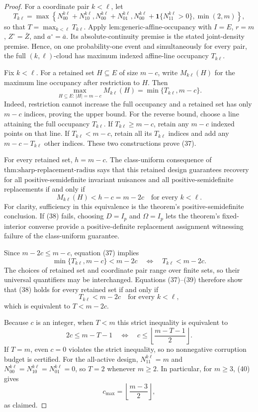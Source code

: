 \documentclass{article}
\begin{document}
\begin{proof}
For a coordinate pair \(k<\ell\), let
\[
 T_{k\ell}
 =\max\!\left\{
 N_{00}^{k\ell}+N_{10}^{k\ell},
 N_{00}^{k\ell}+N_{01}^{k\ell},
 N_{00}^{k\ell}+\mathbf 1\{N_{11}^{k\ell}>0\},
 \min(2,m)
 \right\},
\]
so that \(T=\max_{k<\ell}T_{k\ell}\).  Apply \(\text{lem:generic-affine-occupancy}\) with \(I=E\), \(r=m\), \(Z^\circ=\bar Z\), and \(a^\circ=\bar a\).  Its absolute-continuity premise is the stated joint-density premise.  Hence, on one probability-one event and simultaneously for every pair, the full \((k,\ell)\)-cloud has maximum indexed affine-line occupancy \(T_{k\ell}\).

Fix \(k<\ell\).  For a retained set \(H\subseteq E\) of size \(m-c\), write \(M_{k\ell}(H)\) for the maximum line occupancy after restriction to \(H\).  Then
\[
 \max_{H\subseteq E:\,|H|=m-c}M_{k\ell}(H)
 =\min\{T_{k\ell},m-c\}.
 \tag{37}
\]
Indeed, restriction cannot increase the full occupancy and a retained set has only \(m-c\) indices, proving the upper bound.  For the reverse bound, choose a line attaining the full occupancy \(T_{k\ell}\).  If \(T_{k\ell}\ge m-c\), retain any \(m-c\) indexed points on that line.  If \(T_{k\ell}<m-c\), retain all its \(T_{k\ell}\) indices and add any \(m-c-T_{k\ell}\) other indices.  These two constructions prove (37).

For every retained set, \(h=m-c\).  The class-uniform consequence of \(\text{thm:sharp-replacement-radius}\) says that this retained design guarantees recovery for all positive-semidefinite invariant nuisances and all positive-semidefinite replacements if and only if
\[
 M_{k\ell}(H)<h-c=m-2c
 \quad\text{for every }k<\ell.
 \tag{38}
\]
For clarity, sufficiency in this equivalence is the theorem's positive-semidefinite conclusion.  If (38) fails, choosing \(D=I_p\) and \(\Omega=I_p\) lets the theorem's fixed-interior converse provide a positive-definite replacement assignment witnessing failure of the class-uniform guarantee.

Since \(m-2c\le m-c\), equation (37) implies
\[
 \min\{T_{k\ell},m-c\}<m-2c
 \quad\Longleftrightarrow\quad
 T_{k\ell}<m-2c.
 \tag{39}
\]
The choices of retained set and coordinate pair range over finite sets, so their universal quantifiers may be interchanged.  Equations (37)--(39) therefore show that (38) holds for every retained set if and only if
\[
 T_{k\ell}<m-2c\quad\text{for every }k<\ell,
\]
which is equivalent to \(T<m-2c\).

Because \(c\) is an integer, when \(T<m\) this strict inequality is equivalent to
\[
 2c\le m-T-1
 \quad\Longleftrightarrow\quad
 c\le\left\lfloor\frac{m-T-1}{2}\right\rfloor.
 \tag{40}
\]
If \(T=m\), even \(c=0\) violates the strict inequality, so no nonnegative corruption budget is certified.  For the all-active design, \(N_{11}^{k\ell}=m\) and \(N_{00}^{k\ell}=N_{10}^{k\ell}=N_{01}^{k\ell}=0\), so \(T=2\) whenever \(m\ge2\).  In particular, for \(m\ge3\), (40) gives
\[
 c_{\max}=\left\lfloor\frac{m-3}{2}\right\rfloor,
\]
as claimed.
\end{proof}
\end{document}
